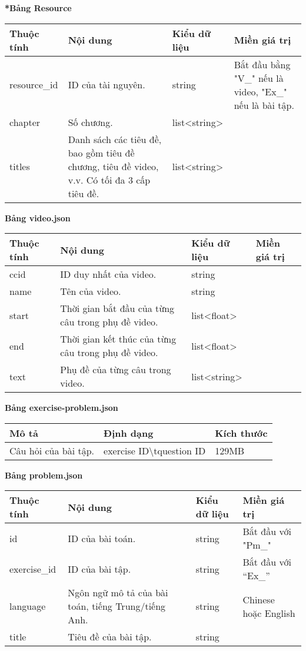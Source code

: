 \textbf{*Bảng Resource}
\begin{center}
\begin{tabular}{|| m{5em}  m{10em}  m{8em}  m{8em}||} 
 \hline
 Thuộc tính & Nội dung & Kiểu dữ liệu & Miền giá trị \\ [0.5ex] 
 \hline\hline
 resource\_id & ID của tài nguyên. & string & Bắt đầu bằng "V\_" nếu là video, "Ex\_" nếu là bài tập. \\ 
 \hline
 chapter & Số chương. & list<string> & \\
 \hline
 titles & Danh sách các tiêu đề, bao gồm tiêu đề chương, tiêu đề video, v.v. Có tối đa 3 cấp tiêu đề. & list<string> &  \\ [1ex] 
 \hline
\end{tabular}
\end{center}
\newpage
\textbf{Bảng video.json}
\begin{center}
\begin{tabular}{|| m{5em}  m{10em}  m{8em}  m{8em}||} 
 \hline
 Thuộc tính & Nội dung & Kiểu dữ liệu & Miền giá trị \\ [0.5ex] 
 \hline\hline
 ccid & ID duy nhất của video. & string &  \\ 
 \hline
 name & Tên của video. & string & \\
 \hline
 start & Thời gian bắt đầu của từng câu trong phụ đề video. & list<float> & \\
 \hline
 end & Thời gian kết thúc của từng câu trong phụ đề video. & list<float> &  \\ \hline
 text & Phụ đề của từng câu trong video. & list<string> &  \\ [1ex] 
 \hline
\end{tabular}
\end{center}
\textbf{Bảng exercise-problem.json}
\begin{center}
\begin{tabular}{|| m{11em}  m{11em}  m{9em} ||} 
 \hline
 Mô tả & Định dạng & Kích thước \\ [0.5ex] 
 \hline\hline
 Câu hỏi của bài tập. & {exercise ID}\textbackslash t{question ID} & 129MB \\ [1ex] 
 \hline
\end{tabular}
\end{center}
\textbf{Bảng problem.json}
\begin{center}
\begin{tabular}{|| m{5em}  m{10em}  m{6em}  m{11em}||} 
 \hline
 Thuộc tính & Nội dung & Kiểu dữ liệu & Miền giá trị \\ [0.5ex] 
 \hline\hline
 id & ID của bài toán. & string & Bắt đầu với "Pm\_"\\
 \hline
 exercise\_id & ID của bài tập. & string & Bắt đầu với “Ex\_” \\ \hline
 language & Ngôn ngữ mô tả của bài toán, tiếng Trung/tiếng Anh. & string & Chinese hoặc English \\ 
 \hline
 title & Tiêu đề của bài tập. & string &  \\ [1ex] 
 \hline
\end{tabular}
\end{center}
